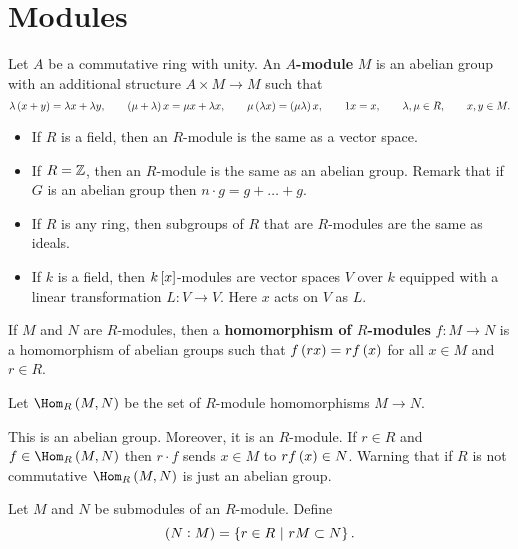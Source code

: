 \section{Modules}

\begin{definition}
Let $ A $ be a commutative ring with unity. An \textbf{$ A $-module} $ M $ is an abelian group with an additional structure $ A \times M \to M $ such that
$$ \lambda\br{x + y} = \lambda x + \lambda y, \qquad \br{\mu + \lambda}x = \mu x + \lambda x, \qquad \mu\br{\lambda x} = \br{\mu\lambda}x, \qquad 1x = x, \qquad \lambda, \mu \in R, \qquad x, y \in M. $$
\end{definition}

\begin{example}
\hfill
\begin{itemize}
\item If $ R $ is a field, then an $ R $-module is the same as a vector space.
\item If $ R = \mathbb{Z} $, then an $ R $-module is the same as an abelian group. Remark that if $ G $ is an abelian group then $ n \cdot g = g + \dots + g $.
\item If $ R $ is any ring, then subgroups of $ R $ that are $ R $-modules are the same as ideals.
\item If $ k $ is a field, then $ k\sbr{x} $-modules are vector spaces $ V $ over $ k $ equipped with a linear transformation $ L : V \to V $. Here $ x $ acts on $ V $ as $ L $.
\end{itemize}
\end{example}

\begin{definition}
If $ M $ and $ N $ are $ R $-modules, then a \textbf{homomorphism of $ R $-modules} $ f : M \to N $ is a homomorphism of abelian groups such that $ f\br{rx} = rf\br{x} $ for all $ x \in M $ and $ r \in R $.
\end{definition}

\begin{definition}
Let $ \Hom_R\br{M, N} $ be the set of $ R $-module homomorphisms $ M \to N $.
\end{definition}

This is an abelian group. Moreover, it is an $ R $-module. If $ r \in R $ and $ f \in \Hom_R\br{M, N} $ then $ r \cdot f $ sends $ x \in M $ to $ rf\br{x} \in N $. Warning that if $ R $ is not commutative $ \Hom_R\br{M, N} $ is just an abelian group.

\begin{definition}
Let $ M $ and $ N $ be submodules of an $ R $-module. Define
$$ \br{N : M} = \cbr{r \in R \st rM \subset N}. $$
\end{definition}

